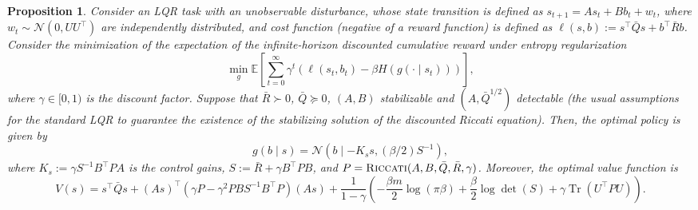 \documentclass[letterpaper]{article} %
\DeclareMathOperator{\Tr}{Tr}     %
\providecommand{\E}{\mathbb{E}} %
\newtheorem{proposition}{Proposition}
\begin{document}
\begin{proposition}\label{thm:opt_f_policy_unobservable_disturbance}
    Consider an LQR task with an unobservable disturbance, whose state transition is defined as $s_{t+1} = A s_t + B b_t + w_t$, where $w_t \sim \mathcal{N}(0, UU^\top)$ are independently distributed, and cost function (negative of a reward function) is defined as $\ell(s, b):= s^\top \bar{Q} s + b^\top \bar{R} b$.
    Consider the minimization of the expectation of the infinite-horizon discounted cumulative reward under entropy regularization
    \begin{equation}
        \min_{g} \E\left[\sum_{t=0}^\infty \gamma^t \left(\ell(s_t, b_t) - \beta H(g(\cdot \mid s_t)) \right)\right] ,
    \end{equation}
    where $\gamma \in [0, 1)$ is the discount factor.
    Suppose that $\bar{R} \succ 0$, $\bar{Q} \succcurlyeq 0$, $(A, B)$ stabilizable and $(A, \bar{Q}^{1/2})$ detectable (the usual assumptions for the standard LQR to guarantee the existence of the stabilizing solution of the discounted Riccati equation).
    Then, the optimal policy is given by 
    \begin{equation}
        g(b \mid s) = \mathcal{N}(b \mid - K_s s, (\beta/2) S^{-1}), \label{eq:lqr_opt_follower_cmdp}
    \end{equation}
    where $K_s := \gamma S^{-1} B^\top P A$ is the control gains, $S := \bar{R} + \gamma B^\top P B$, and $P = \text{\textsc{Riccati}}(A, B, \bar{Q}, \bar{R}, \gamma)$. 
    Moreover, the optimal value function is 
    \begin{equation}
        V(s) = s^\top \bar{Q} s + (A s)^\top (\gamma P - \gamma^2 P B S^{-1} B^\top P) (A s) 
        + \frac{1}{1 - \gamma} \left( - \frac{\beta m}{2} \log(\pi \beta) +  \frac{\beta}{2} \log \det(S) + \gamma \Tr(U^\top P U) \right).
    \end{equation}
\end{proposition}
\end{document}
